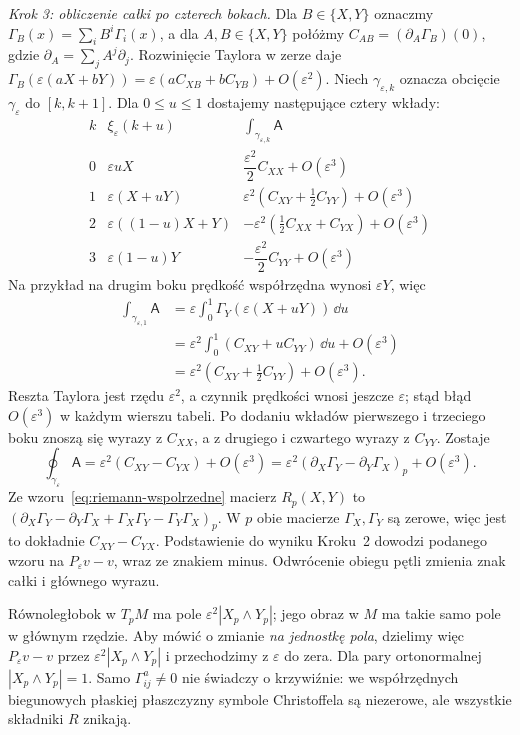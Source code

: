 \begin{uwaga}
\emph{Krok 3: obliczenie całki po czterech bokach.}
Dla $B\in\{X,Y\}$ oznaczmy
$\Gamma_B(x)=\sum_iB^i\Gamma_i(x)$,
a dla $A,B\in\{X,Y\}$ połóżmy
$C_{AB}=(\partial_A\Gamma_B)(0)$,
gdzie $\partial_A=\sum_jA^j\partial_j$.
Rozwinięcie Taylora w zerze daje
$\Gamma_B(\varepsilon(aX+bY))
=\varepsilon(aC_{XB}+bC_{YB})+O(\varepsilon^2)$.
Niech $\gamma_{\varepsilon,k}$ oznacza obcięcie
$\gamma_\varepsilon$ do $[k,k+1]$.
Dla $0\leq u\leq1$ dostajemy następujące cztery wkłady:
\[
 \begin{array}{c|c|c}
 k&\xi_\varepsilon(k+u)&
             \displaystyle\int_{\gamma_{\varepsilon,k}}\mathsf A\\ \hline
 0&\varepsilon uX&
      \dfrac{\varepsilon^2}{2}C_{XX}+O(\varepsilon^3)\\[4pt]
 1&\varepsilon(X+uY)&
      \varepsilon^2(C_{XY}+\tfrac12C_{YY})+O(\varepsilon^3)\\[4pt]
 2&\varepsilon((1-u)X+Y)&
      -\varepsilon^2(\tfrac12C_{XX}+C_{YX})+O(\varepsilon^3)\\[4pt]
 3&\varepsilon(1-u)Y&
      -\dfrac{\varepsilon^2}{2}C_{YY}+O(\varepsilon^3)
 \end{array}
\]
Na przykład na drugim boku prędkość współrzędna wynosi
$\varepsilon Y$, więc
\[
 \begin{aligned}
 \int_{\gamma_{\varepsilon,1}}\mathsf A
 &=\varepsilon\int_0^1
              \Gamma_Y(\varepsilon(X+uY))\,\dd u\\
 &=\varepsilon^2\int_0^1(C_{XY}+uC_{YY})\,\dd u
              +O(\varepsilon^3)\\
 &=\varepsilon^2(C_{XY}+\tfrac12C_{YY})+O(\varepsilon^3).
 \end{aligned}
\]
Reszta Taylora jest rzędu $\varepsilon^2$, a czynnik
prędkości wnosi jeszcze $\varepsilon$; stąd błąd
$O(\varepsilon^3)$ w każdym wierszu tabeli.
Po dodaniu wkładów pierwszego i trzeciego boku
znoszą się wyrazy z $C_{XX}$, a z drugiego i czwartego
wyrazy z $C_{YY}$. Zostaje
\[
 \oint_{\gamma_\varepsilon}\mathsf A
 =\varepsilon^2(C_{XY}-C_{YX})+O(\varepsilon^3)
 =\varepsilon^2(\partial_X\Gamma_Y-\partial_Y\Gamma_X)_p
       +O(\varepsilon^3).
\]
Ze wzoru~\eqref{eq:riemann-wspolrzedne} macierz
$R_p(X,Y)$ to
$(\partial_X\Gamma_Y-\partial_Y\Gamma_X+
\Gamma_X\Gamma_Y-\Gamma_Y\Gamma_X)_p$.
W $p$ obie macierze $\Gamma_X,\Gamma_Y$ są zerowe,
więc jest to dokładnie $C_{XY}-C_{YX}$.
Podstawienie do wyniku Kroku~2 dowodzi podanego wzoru na
$P_\varepsilon v-v$, wraz ze znakiem minus.
Odwrócenie obiegu pętli zmienia znak całki i głównego wyrazu.

Równoległobok w $T_pM$ ma pole
$\varepsilon^2|X_p\wedge Y_p|$; jego obraz w $M$
ma takie samo pole w głównym rzędzie.
Aby mówić o zmianie \emph{na jednostkę pola},
dzielimy więc $P_\varepsilon v-v$ przez
$\varepsilon^2|X_p\wedge Y_p|$ i przechodzimy z
$\varepsilon$ do zera. Dla pary ortonormalnej
$|X_p\wedge Y_p|=1$.
Samo $\Gamma^a_{ij}\ne0$
nie świadczy o krzywiźnie: we współrzędnych biegunowych
płaskiej płaszczyzny symbole Christoffela są niezerowe,
ale wszystkie składniki $R$ znikają.
\end{uwaga}

